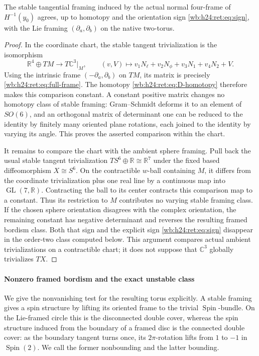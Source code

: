 \begin{proposition}\label{wb:h24:ret:framing-proposition}
The stable tangential framing induced by the actual normal four-frame
of \(H^{-1}(y_0)\) agrees, up to homotopy and the orientation sign
\eqref{wb:h24:ret:eq:sign}, with the Lie framing
\((\partial_a,\partial_b)\) on the native two-torus.
\end{proposition}
\begin{proof}
In the coordinate chart, the stable tangent trivialization is the
isomorphism
\[
 \mathbb R^4\oplus TM\longrightarrow T\mathbb C^3|_M,
 \qquad (v,V)\longmapsto
 v_1N_\ell+v_2N_\phi+v_3N_1+v_4N_2+V.
\]
Using the intrinsic frame \((-\partial_a,\partial_b)\) on \(TM\),
its matrix is precisely \eqref{wb:h24:ret:eq:full-frame}.  The homotopy
\eqref{wb:h24:ret:eq:D-homotopy} therefore makes this comparison constant.
A constant positive matrix changes no homotopy class of stable
framing: Gram--Schmidt deforms it to an element of \(SO(6)\), and
an orthogonal matrix of determinant one can be reduced to the identity
by finitely many oriented plane rotations, each joined to the
identity by varying its angle.  This proves the asserted comparison
within the chart.

It remains to compare the chart with the ambient sphere framing.
Pull back the usual stable tangent trivialization
\(TS^6\oplus\mathbb R\cong\mathbb R^7\) under the fixed based diffeomorphism
\(X\cong S^6\).  On the contractible \(w\)-ball containing \(M\),
it differs from the coordinate trivialization plus one real line by
a continuous map into \(\operatorname{GL}(7,\mathbb R)\).  Contracting the ball to its
center contracts this comparison map to a constant.  Thus its
restriction to \(M\) contributes no varying stable framing class.
If the chosen sphere orientation disagrees with the complex
orientation, the remaining constant has negative determinant and
reverses the resulting framed bordism class.  Both that sign and the
explicit sign \eqref{wb:h24:ret:eq:sign} disappear in the order-two class
computed below.  This argument compares actual ambient
trivializations on a contractible chart; it does not suppose that
\(\mathbb C^3\) globally trivializes \(TX\).
\end{proof}

\paragraph{Nonzero framed bordism and the exact unstable class}

We give the nonvanishing test for the resulting torus explicitly.
A stable framing gives a spin structure by lifting its oriented frame
to the trivial \(\operatorname{Spin}\)-bundle.  On the Lie-framed
circle this is the disconnected double cover, whereas the spin
structure induced from the boundary of a framed disc is the
connected double cover: as the boundary tangent turns once, its
\(2\pi\)-rotation lifts from \(1\) to \(-1\) in
\(\operatorname{Spin}(2)\).  We call the former nonbounding and the
latter bounding.

